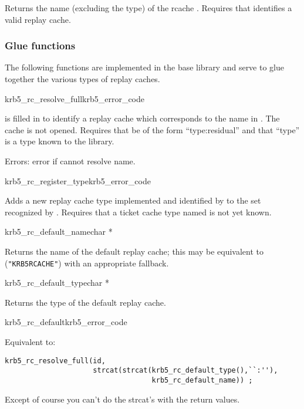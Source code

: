 Returns the name (excluding the type) of the rcache .
Requires that  identifies a valid replay cache.

\subsubsection{Glue functions}
The following functions are implemented in the base library and serve to
glue together the various types of replay caches.

\begin{funcdecl}{krb5_rc_resolve_full}{krb5_error_code}{\funcinout}
\funcin
{}
\end{funcdecl}

 is filled in to identify a replay cache which
corresponds to the name in .  The cache is not opened.
Requires that  be of the form ``type:residual''
and that ``type'' is a type known to the library.

Errors: error if cannot resolve name.

\begin{funcdecl}{krb5_rc_register_type}{krb5_error_code}{\funcin}
\end{funcdecl}
Adds a new replay cache type implemented and identified by
 to the set recognized by
.  Requires that a ticket cache type named
 is not yet known.


\begin{funcdecl}{krb5_rc_default_name}{char *}{\funcvoid}
\end{funcdecl}
Returns  the name of the default replay cache; this may be equivalent to
({\tt "KRB5RCACHE"}) with an appropriate fallback.

\begin{funcdecl}{krb5_rc_default_type}{char *}{\funcvoid}
\end{funcdecl}

Returns the type of the default replay cache.

\begin{funcdecl}{krb5_rc_default}{krb5_error_code}{\funcinout}
\end{funcdecl}

Equivalent to:
\begin{verbatim}
krb5_rc_resolve_full(id, 
                     strcat(strcat(krb5_rc_default_type(),``:''),
                                   krb5_rc_default_name)) ;
\end{verbatim}
Except of course you can't do the strcat's with the return values.
